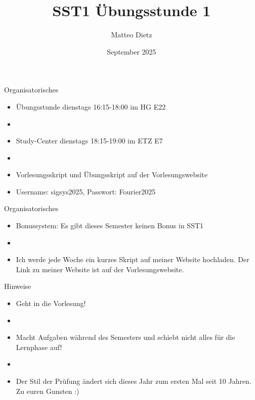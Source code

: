 \documentclass[14pt, aspectratio=169, handout]{beamer}
\title{SST1 Übungsstunde 1}
\author{Matteo Dietz}
\date{September 2025}
\begin{document}
\maketitle

\begin{frame}{Organisatorisches}
    \begin{itemize}
        \item Übungsstunde dienstags 16:15-18:00 im HG E22
        \item[]
        \item Study-Center dienstags 18:15-19:00 im ETZ E7
        \item[]
        \item Vorlesungsskript und Übungsskript auf der Vorlesungswebsite
        \item[] Username: sigsys2025, \hspace{10pt} Passwort: Fourier2025
    \end{itemize}
\end{frame}

\begin{frame}{Organisatorisches}
    \begin{itemize}
        \item Bonussystem: Es gibt dieses Semester keinen Bonus in SST1
        \item[] 
        \item Ich werde jede Woche ein kurzes Skript auf meiner Website hochladen. Der Link zu meiner Website ist auf der Vorlesungswebsite.
    \end{itemize}
\end{frame}

\begin{frame}{Hinweise}
\begin{itemize}
    \item \alert{Geht in die Vorlesung!}
    \item[] 
    \item \alert{Macht Aufgaben während des Semesters und schiebt nicht alles für die Lernphase auf!}
    \item[] 
    \item Der Stil der Prüfung ändert sich dieses Jahr zum ersten Mal seit 10 Jahren. Zu euren Gunsten :)
\end{itemize}
\end{frame}
\end{document}
